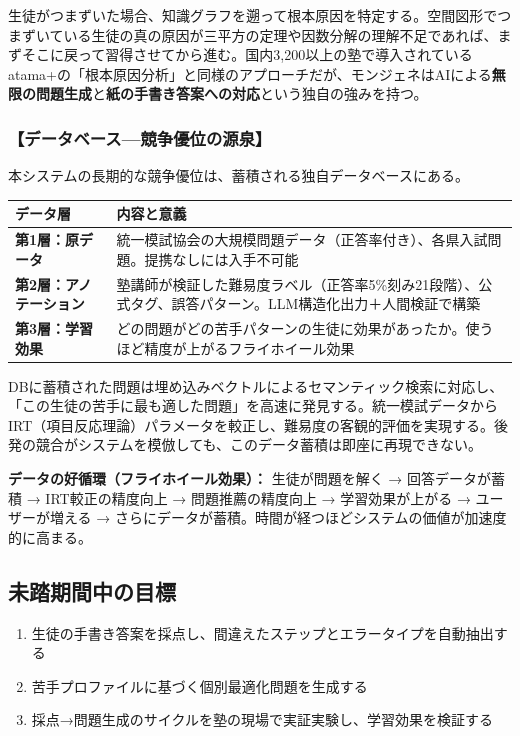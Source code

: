 \documentclass[paper=a4,fontsize=10.5bp,jafontsize=10.5bp]{jlreq}
\begin{document}
生徒がつまずいた場合、知識グラフを遡って根本原因を特定する。空間図形でつまずいている生徒の真の原因が三平方の定理や因数分解の理解不足であれば、まずそこに戻って習得させてから進む。国内3,200以上の塾で導入されているatama+の「根本原因分析」と同様のアプローチだが、モンジェネはAIによる\textbf{無限の問題生成}と\textbf{紙の手書き答案への対応}という独自の強みを持つ。

\subsubsection{【データベース---競争優位の源泉】}

本システムの長期的な競争優位は、蓄積される独自データベースにある。


\begin{footnotesize}\noindent
\begin{tabularx}{\linewidth}{>{\bfseries}l X}
\toprule
データ層 & 内容と意義 \\
\midrule
第1層：原データ & 統一模試協会の大規模問題データ（正答率付き）、各県入試問題。提携なしには入手不可能 \\
第2層：アノテーション & 塾講師が検証した難易度ラベル（正答率5\%刻み21段階）、公式タグ、誤答パターン。LLM構造化出力＋人間検証で構築 \\
第3層：学習効果 & どの問題がどの苦手パターンの生徒に効果があったか。使うほど精度が上がるフライホイール効果 \\
\bottomrule
\end{tabularx}
\end{footnotesize}


DBに蓄積された問題は埋め込みベクトルによるセマンティック検索に対応し、「この生徒の苦手に最も適した問題」を高速に発見する。統一模試データからIRT（項目反応理論）パラメータを較正し、難易度の客観的評価を実現する。後発の競合がシステムを模倣しても、このデータ蓄積は即座に再現できない。


\begin{graybox}
\textbf{データの好循環（フライホイール効果）：}
生徒が問題を解く → 回答データが蓄積 → IRT較正の精度向上 → 問題推薦の精度向上 → 学習効果が上がる → ユーザーが増える → さらにデータが蓄積。時間が経つほどシステムの価値が加速度的に高まる。
\end{graybox}

\subsection{未踏期間中の目標}

\begin{enumerate}[leftmargin=2em]
  \item 生徒の手書き答案を採点し、間違えたステップとエラータイプを自動抽出する
  \item 苦手プロファイルに基づく個別最適化問題を生成する
  \item 採点→問題生成のサイクルを塾の現場で実証実験し、学習効果を検証する
\end{enumerate}
\end{document}
